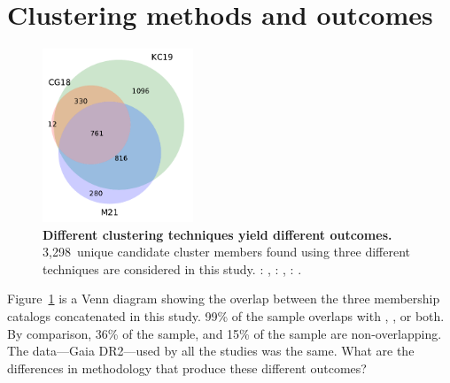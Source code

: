 \documentclass[12pt,twocolumn,tighten]{aastex63}
\newcommand{\nkinematic}{3{,}298} %
\begin{document}
% 
% 
% 
% 
% 
% 

\clearpage
                            
 

\appendix
\section{Clustering methods and outcomes}
\label{app:clustering}

\begin{figure}[h]
	\begin{center}
		\leavevmode
		\includegraphics[width=0.4\textwidth]{f10.pdf}
	\end{center}
	\vspace{-0.7cm}
  \caption{ {\bf Different clustering techniques yield different
  outcomes.} \nkinematic\ unique candidate cluster members found
  using three different techniques are considered in this study.
  : \citet{cantatgaudin_gaia_2018},
  :
  \citet{kounkel_untangling_2019}, :
  \citet{meingast_2021}.
  \label{fig:venn}
	}
\end{figure}

Figure~\ref{fig:venn} is a Venn diagram showing the overlap between
the three membership catalogs concatenated in this study.  99\% of the
 sample overlaps with
, , or
both.  By comparison, 36\% of the 
sample, and 15\% of the  sample are
non-overlapping.
The data---Gaia DR2---used by all the studies was the same.
What are the differences in methodology that produce these different
outcomes?
\end{document}
